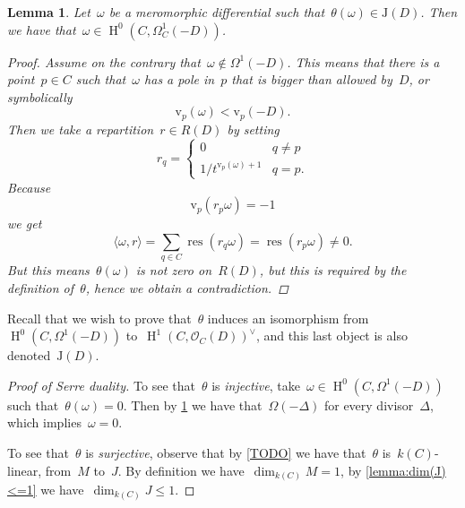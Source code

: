 \documentclass[10pt,a4paper]{article}
\theoremstyle{lecture}
\newtheorem{lemma}[theorem]{Lemma}
\newcommand\dash{\nobreakdash-\hspace{0pt}}
\DeclareMathOperator\HH{H}
\DeclareMathOperator\res{res}
\begin{document}
\begin{lemma}
  \label{lemma:theta-J(D)}
  Let~$\omega$ be a meromorphic differential such that~$\theta(\omega)\in\mathrm{J}(D)$. Then we have that~$\omega\in\HH^0(C,\Omega_C^1(-D))$.

  \begin{proof}
    Assume on the contrary that~$\omega\notin\Omega^1(-D)$. This means that there is a point~$p\in C$ such that~$\omega$ has a pole in~$p$ that is bigger than allowed by~$D$, or symbolically
    \begin{equation}
      \mathrm{v}_p(\omega)<\mathrm{v}_p(-D).
    \end{equation}
    Then we take a repartition~$r\in R(D)$ by setting
    \begin{equation}
      r_q=
      \begin{cases}
        0 & q\neq p \\
        1/t^{\mathrm{v}_p(\omega)+1} & q=p.
      \end{cases}
    \end{equation}
    Because
    \begin{equation}
      \mathrm{v}_p(r_p\omega)=-1
    \end{equation}
    we get
    \begin{equation}
      \langle\omega,r\rangle=\sum_{q\in C}\res(r_q\omega)=\res(r_p\omega)\neq 0.
    \end{equation}
    But this means~$\theta(\omega)$ is not zero on~$R(D)$, but this is required by the definition of~$\theta$, hence we obtain a contradiction.
  \end{proof}
\end{lemma}

Recall that we wish to prove that~$\theta$ induces an isomorphism from~$\HH^0(C,\Omega^1(-D))$ to~$\HH^1(C,\mathcal{O}_C(D))^\vee$, and this last object is also denoted~$\mathrm{J}(D)$.
\begin{proof}[Proof of Serre duality]
  To see that~$\theta$ is \emph{injective}, take~$\omega\in\HH^0(C,\Omega^1(-D))$ such that~$\theta(\omega)=0$. Then by \cref{lemma:theta-J(D)} we have that~$\Omega(-\Delta)$ for every divisor~$\Delta$, which implies~$\omega=0$\expand.

  To see that~$\theta$ is \emph{surjective}, observe that by \cref{TODO} we have that~$\theta$ is~$k(C)$\dash linear, from~$M$ to~$J$. By definition we have~$\dim_{k(C)}M=1$, by \cref{lemma:dim(J)<=1} we have~$\dim_{k(C)}J\leq 1$.
\end{proof}
\end{document}
